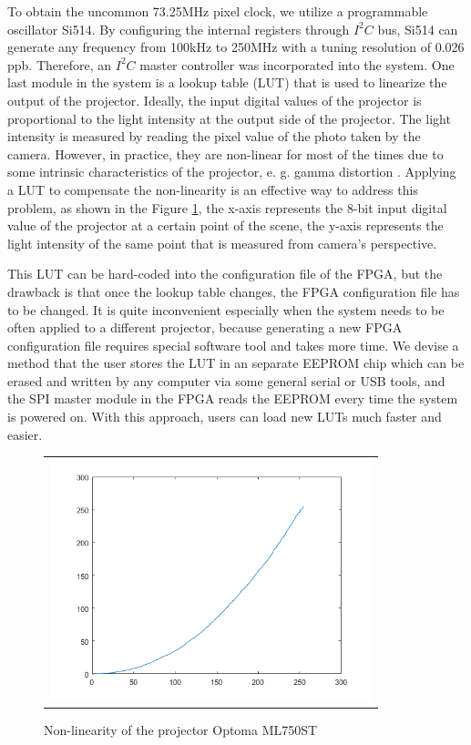 \documentclass[]{spie}  %
\begin{document}
To obtain the uncommon 73.25MHz pixel clock, we utilize a programmable oscillator Si514. By configuring the internal registers through $I^2C$ bus, Si514 can generate any frequency from 100kHz to 250MHz with a tuning resolution of 0.026 ppb. Therefore, an $I^2C$ master controller was incorporated into the system. One last module in the system is a lookup table (LUT) that is used to linearize the output of the projector. Ideally, the input digital values of the projector is proportional to the light intensity at the output side of the projector. The light intensity is measured by reading the pixel value of the photo taken by the camera. However, in practice, they are non-linear for most of the times due to some intrinsic characteristics of the projector, e. g. gamma distortion \cite{gamm10}. Applying a LUT to compensate the non-linearity is an effective way to address this problem, as shown in the Figure \ref{Fig:2}, the x-axis represents the 8-bit input digital value of the projector at a certain point of the scene, the y-axis represents the light intensity of the same point that is measured from camera's perspective.

This LUT can be hard-coded into the configuration file of the FPGA, but the drawback is that once the lookup table changes, the FPGA configuration file has to be changed. It is quite inconvenient especially when the system needs to be often applied to a different projector, because generating a new FPGA configuration file requires special software tool and takes more time. We devise a method that the user stores the LUT in an separate EEPROM chip which can be erased and written by any computer via some general serial or USB tools, and the SPI master module in the FPGA reads the EEPROM every time the system  is powered on. With this approach, users can load new LUTs much faster and easier.

\begin{figure}
   \begin{center}
   \begin{tabular}{c}
   \includegraphics[height=7cm]{wolut.png}
   \end{tabular}
   \end{center}
   \caption{Non-linearity of the projector Optoma ML750ST}
   \label{Fig:2}
   \end{figure} 
\end{document}
